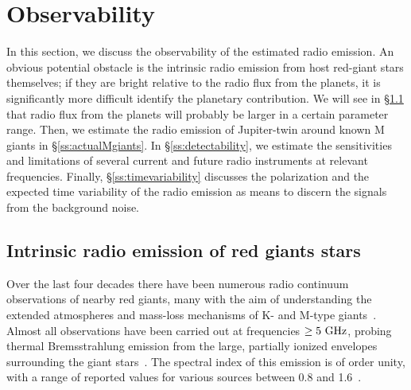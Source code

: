 \documentclass[iop,numberedappendix,apj]{emulateapj}
\begin{document}
\section{Observability}
\label{s:observability}

In this section, we discuss the observability of the estimated radio emission. 
An obvious potential obstacle is the intrinsic radio emission from host red-giant stars themselves; if they are bright relative to the radio flux from the planets, it is significantly more difficult identify the planetary contribution.
We will see in \S\ref{ss:RGradio} that radio flux from the planets will probably be larger in a certain parameter range. 
Then, we estimate the radio emission of Jupiter-twin around known M giants in \S\ref{ss:actualMgiants}. 
In \S\ref{ss:detectability}, we estimate the sensitivities and limitations of several current and future
radio instruments at relevant frequencies.
Finally, \S\ref{ss:timevariability} discusses the polarization and the expected time variability of the radio emission as means to discern the signals from the background noise. 


\subsection{Intrinsic radio emission of red giants stars}
\label{ss:RGradio}

Over the last four decades there have been numerous radio continuum observations of nearby red giants, many with the aim of understanding the extended atmospheres and mass-loss mechanisms of K- and M-type giants~\citep[e.g.,][]{Newell1982, Knapp1995, Skinner1997, Lim1998, OGorman2013}.
Almost all observations have been carried out 
at frequencies $\geq 5~\rm GHz$, 
probing thermal Bremsstrahlung emission from the large, partially ionized envelopes surrounding the giant stars~\citep{drake1986}.
The spectral index of this emission is of order unity, with a range of reported values for various sources between 0.8 and 1.6~\citep{OGorman2013}.
\end{document}
